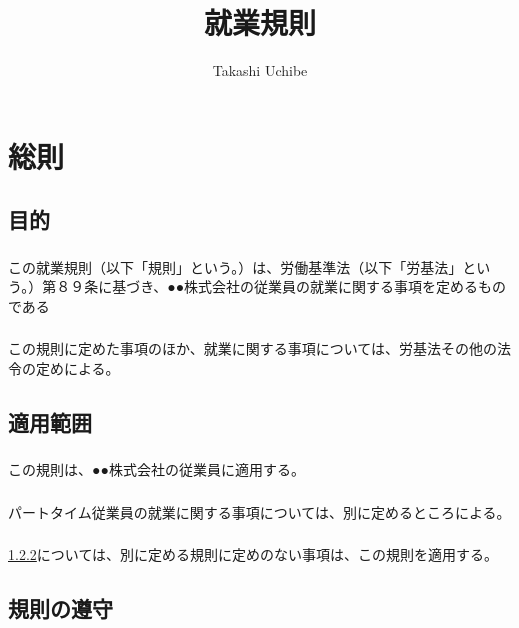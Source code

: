\documentclass{jsarticle}
\begin{document}
\title{就業規則}
\author{Takashi Uchibe}
\maketitle

\section{総則}
\label{就規_章_総則}

\subsection{目的}
\label{就規_条_目的}
\subsubsection{}
\label{就規_項_目的}
この就業規則（以下「規則」という。）は、労働基準法（以下「労基法」という。）第８９条に基づき、●●株式会社の従業員の就業に関する事項を定めるものである
\subsubsection{}
\label{就規_項_目的その他}
この規則に定めた事項のほか、就業に関する事項については、労基法その他の法令の定めによる。

\subsection{適用範囲}
\label{就規_条_適用範囲}
\subsubsection{}
\label{就規_項_適用範囲}
この規則は、●●株式会社の従業員に適用する。
\subsubsection{}
\label{就規_項_適用範囲（パート）}
パートタイム従業員の就業に関する事項については、別に定めるところによる。
\subsubsection{}
\label{就規_項_適用範囲その他}
\ref{就規_項_適用範囲（パート）}については、別に定める規則に定めのない事項は、この規則を適用する。

\subsection{規則の遵守}
\label{就規_条_規則の遵守}
\end{document}
